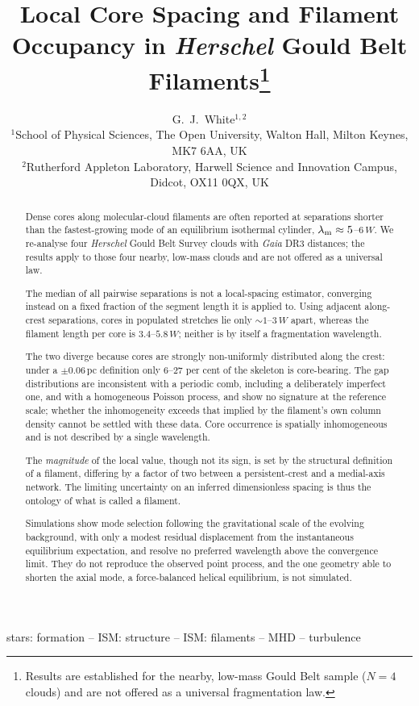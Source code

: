 \documentclass[usenatbib,twoside,twocolumn]{mnras}
\title[Core spacing and filament occupancy in HGBS filaments]{Local Core Spacing and Filament Occupancy in \textit{Herschel} Gould Belt Filaments\thanks{Results are established for the nearby, low-mass Gould Belt sample ($N=4$ clouds) and are not offered as a universal fragmentation law.}}
\author[G.~J.~White]{G.~J.~White$^{1,2}$\\
$^{1}$School of Physical Sciences, The Open University, Walton Hall, Milton Keynes, MK7 6AA, UK\\
$^{2}$Rutherford Appleton Laboratory, Harwell Science and Innovation Campus, Didcot, OX11 0QX, UK}
\begin{document}
\maketitle

\begin{abstract}
Dense cores along molecular-cloud filaments are often reported at separations shorter than the fastest-growing mode of an equilibrium isothermal cylinder, $\lambda_{\rm m}\approx5$--$6\,W$. We re-analyse four \textit{Herschel} Gould Belt Survey clouds with \textit{Gaia} DR3 distances; the results apply to those four nearby, low-mass clouds and are not offered as a universal law.

The median of all pairwise separations is not a local-spacing estimator, converging instead on a fixed fraction of the segment length it is applied to. Using adjacent along-crest separations, cores in populated stretches lie only $\sim1$--$3\,W$ apart, whereas the filament length per core is $3.4$--$5.8\,W$; neither is by itself a fragmentation wavelength.

The two diverge because cores are strongly non-uniformly distributed along the crest: under a $\pm0.06$\,pc definition only $6$--$27$ per cent of the skeleton is core-bearing. The gap distributions are inconsistent with a periodic comb, including a deliberately imperfect one, and with a homogeneous Poisson process, and show no signature at the reference scale; whether the inhomogeneity exceeds that implied by the filament's own column density cannot be settled with these data. Core occurrence is spatially inhomogeneous and is not described by a single wavelength.

The \emph{magnitude} of the local value, though not its sign, is set by the structural definition of a filament, differing by a factor of two between a persistent-crest and a medial-axis network. The limiting uncertainty on an inferred dimensionless spacing is thus the ontology of what is called a filament.

Simulations show mode selection following the gravitational scale of the evolving background, with only a modest residual displacement from the instantaneous equilibrium expectation, and resolve no preferred wavelength above the convergence limit. They do not reproduce the observed point process, and the one geometry able to shorten the axial mode, a force-balanced helical equilibrium, is not simulated.
\end{abstract}

\begin{keywords}
stars: formation -- ISM: structure -- ISM: filaments -- MHD -- turbulence
\end{keywords}
\end{document}
